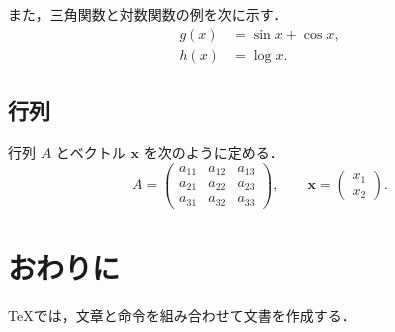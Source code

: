\documentclass[uplatex,dvipdfmx,a4paper,12pt]{jsarticle}
\begin{document}
また，三角関数と対数関数の例を次に示す．
\begin{align}
  g(x)&=\sin x+\cos x, \\
  h(x)&=\log x.
\end{align}

\subsection{行列}

行列 $A$ とベクトル $\boldsymbol{x}$ を次のように定める．
\[
  A=
  \begin{pmatrix}
    a_{11} & a_{12} & a_{13} \\
    a_{21} & a_{22} & a_{23} \\
    a_{31} & a_{32} & a_{33} 
  \end{pmatrix},
  \qquad
  \boldsymbol{x}=
  \begin{pmatrix}
    x_1 \\
    x_2
  \end{pmatrix}.
\]

\section{おわりに}

TeXでは，文章と命令を組み合わせて文書を作成する．
\end{document}

